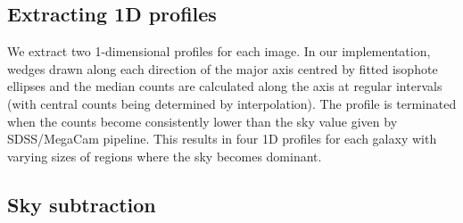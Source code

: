 \subsection{Extracting 1D profiles}
We extract two 1-dimensional profiles for each image. In our implementation, wedges drawn along each direction of the major axis centred by fitted isophote ellipses and the median counts are calculated along the axis at regular intervals (with central counts being determined by interpolation). The profile is terminated when the counts become consistently lower than the sky value given by SDSS/MegaCam pipeline. This results in four 1D profiles for each galaxy with varying sizes of regions where the sky becomes dominant. 

\subsection{Sky subtraction}
